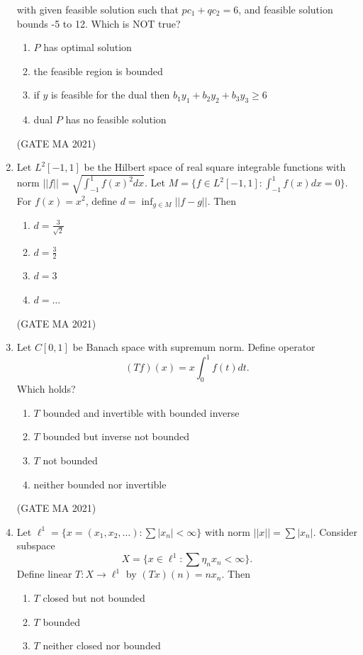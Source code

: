 \documentclass[journal,12pt,onecolumn]{IEEEtran}
\theoremstyle{remark}
\begin{document}
\begin{enumerate}
    with given feasible solution such that $p c_1 + q c_2 = 6$, and feasible solution bounds -5 to 12. Which is NOT true?
    \begin{enumerate}
        \item $P$ has optimal solution
        \item the feasible region is bounded
        \item if $y$ is feasible for the dual then $b_1 y_1 + b_2 y_2 + b_3 y_3 \geq 6$
        \item dual $P$ has no feasible solution
    \end{enumerate}
\hfill(GATE MA 2021)
    \item Let $L^2[-1,1]$ be the Hilbert space of real square integrable functions with norm $||f|| = \sqrt{\int_{-1}^1 f(x)^2 dx}$. Let $M = \{f \in L^2[-1,1] : \int_{-1}^1 f(x) dx = 0\}$. For $f(x) = x^2$, define $d = \inf_{g \in M} ||f - g||$. Then
    \begin{enumerate}
        \item $d = \frac{3}{\sqrt{2}}$
        \item $d = \frac{3}{2}$
        \item $d = 3$
        \item $d = \ldots$
    \end{enumerate}
\hfill(GATE MA 2021)
    \item Let $C[0,1]$ be Banach space with supremum norm. Define operator
    $$
    (Tf)(x) = x \int_0^1 f(t) dt.
    $$
    Which holds?
    \begin{enumerate}
        \item $T$ bounded and invertible with bounded inverse
        \item $T$ bounded but inverse not bounded
        \item $T$ not bounded
        \item neither bounded nor invertible
    \end{enumerate}
\hfill(GATE MA 2021)
    \item Let $\ell^1 = \{x = (x_1, x_2, \dots): \sum |x_n| < \infty\}$ with norm $||x|| = \sum |x_n|$. Consider subspace 
    $$
    X = \{ x \in \ell^1 : \sum \eta_n x_n < \infty \}.
    $$
    Define linear $T:X \to \ell^1$ by $(Tx)(n) = n x_n$. Then
    \begin{enumerate}
        \item $T$ closed but not bounded
        \item $T$ bounded
        \item $T$ neither closed nor bounded

\end{enumerate}
\end{enumerate}
\end{document}
